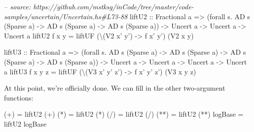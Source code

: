 \documentclass[]{article}
\newenvironment{Shaded}{}{}
\newcommand{\DataTypeTok}[1]{\textcolor[rgb]{0.56,0.13,0.00}{{#1}}}
\newcommand{\CommentTok}[1]{\textcolor[rgb]{0.38,0.63,0.69}{\textit{{#1}}}}
\newcommand{\OtherTok}[1]{\textcolor[rgb]{0.00,0.44,0.13}{{#1}}}
\newcommand{\FunctionTok}[1]{\textcolor[rgb]{0.02,0.16,0.49}{{#1}}}
\newcommand{\NormalTok}[1]{{#1}}
\begin{document}
\begin{Shaded}
\begin{Highlighting}[]
\CommentTok{-- source: https://github.com/mstksg/inCode/tree/master/code-samples/uncertain/Uncertain.hs#L73-88}
\NormalTok{liftU2}
\OtherTok{    ::} \DataTypeTok{Fractional} \NormalTok{a}
    \OtherTok{=>} \NormalTok{(forall s}\FunctionTok{.} \DataTypeTok{AD} \NormalTok{s (}\DataTypeTok{Sparse} \NormalTok{a) }\OtherTok{->} \DataTypeTok{AD} \NormalTok{s (}\DataTypeTok{Sparse} \NormalTok{a) }\OtherTok{->} \DataTypeTok{AD} \NormalTok{s (}\DataTypeTok{Sparse} \NormalTok{a))}
    \OtherTok{->} \DataTypeTok{Uncert} \NormalTok{a}
    \OtherTok{->} \DataTypeTok{Uncert} \NormalTok{a}
    \OtherTok{->} \DataTypeTok{Uncert} \NormalTok{a}
\NormalTok{liftU2 f x y }\FunctionTok{=} \NormalTok{liftUF (\textbackslash{}(}\DataTypeTok{V2} \NormalTok{x' y') }\OtherTok{->} \NormalTok{f x' y') (}\DataTypeTok{V2} \NormalTok{x y)}

\NormalTok{liftU3}
\OtherTok{    ::} \DataTypeTok{Fractional} \NormalTok{a}
    \OtherTok{=>} \NormalTok{(forall s}\FunctionTok{.} \DataTypeTok{AD} \NormalTok{s (}\DataTypeTok{Sparse} \NormalTok{a) }\OtherTok{->} \DataTypeTok{AD} \NormalTok{s (}\DataTypeTok{Sparse} \NormalTok{a) }\OtherTok{->} \DataTypeTok{AD} \NormalTok{s (}\DataTypeTok{Sparse} \NormalTok{a) }\OtherTok{->} \DataTypeTok{AD} \NormalTok{s (}\DataTypeTok{Sparse} \NormalTok{a))}
    \OtherTok{->} \DataTypeTok{Uncert} \NormalTok{a}
    \OtherTok{->} \DataTypeTok{Uncert} \NormalTok{a}
    \OtherTok{->} \DataTypeTok{Uncert} \NormalTok{a}
    \OtherTok{->} \DataTypeTok{Uncert} \NormalTok{a}
\NormalTok{liftU3 f x y z }\FunctionTok{=} \NormalTok{liftUF (\textbackslash{}(}\DataTypeTok{V3} \NormalTok{x' y' z') }\OtherTok{->} \NormalTok{f x' y' z') (}\DataTypeTok{V3} \NormalTok{x y z)}
\end{Highlighting}
\end{Shaded}

At this point, we're officially done. We can fill in the other
two-argument functions:

\begin{Shaded}
\begin{Highlighting}[]
\NormalTok{(}\FunctionTok{+}\NormalTok{)     }\FunctionTok{=} \NormalTok{liftU2 (}\FunctionTok{+}\NormalTok{)}
\NormalTok{(}\FunctionTok{*}\NormalTok{)     }\FunctionTok{=} \NormalTok{liftU2 (}\FunctionTok{*}\NormalTok{)}
\NormalTok{(}\FunctionTok{/}\NormalTok{)     }\FunctionTok{=} \NormalTok{liftU2 (}\FunctionTok{/}\NormalTok{)}
\NormalTok{(}\FunctionTok{**}\NormalTok{)    }\FunctionTok{=} \NormalTok{liftU2 (}\FunctionTok{**}\NormalTok{)}
\NormalTok{logBase }\FunctionTok{=} \NormalTok{liftU2 logBase}
\end{Highlighting}
\end{Shaded}
\end{document}
